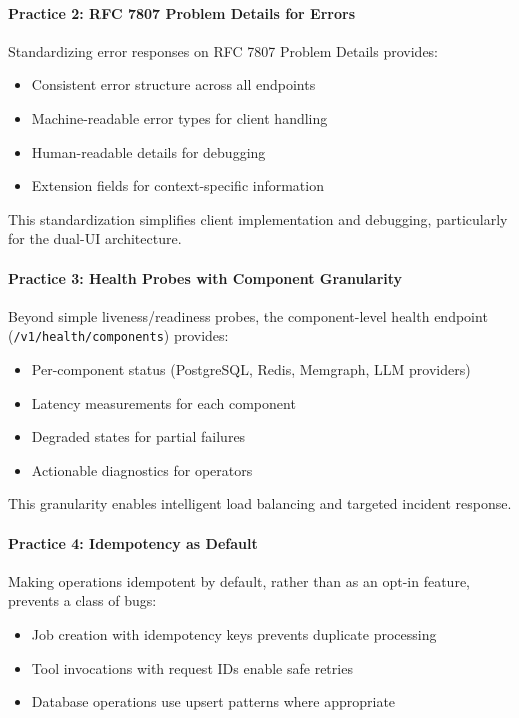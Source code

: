\paragraph{Practice 2: RFC 7807 Problem Details for Errors}

Standardizing error responses on RFC 7807 Problem Details provides:

\begin{itemize}
    \item Consistent error structure across all endpoints
    \item Machine-readable error types for client handling
    \item Human-readable details for debugging
    \item Extension fields for context-specific information
\end{itemize}

This standardization simplifies client implementation and debugging, particularly for the dual-UI architecture.

\paragraph{Practice 3: Health Probes with Component Granularity}

Beyond simple liveness/readiness probes, the component-level health endpoint (\texttt{/v1/health/components}) provides:

\begin{itemize}
    \item Per-component status (PostgreSQL, Redis, Memgraph, LLM providers)
    \item Latency measurements for each component
    \item Degraded states for partial failures
    \item Actionable diagnostics for operators
\end{itemize}

This granularity enables intelligent load balancing and targeted incident response.

\paragraph{Practice 4: Idempotency as Default}

Making operations idempotent by default, rather than as an opt-in feature, prevents a class of bugs:

\begin{itemize}
    \item Job creation with idempotency keys prevents duplicate processing
    \item Tool invocations with request IDs enable safe retries
    \item Database operations use upsert patterns where appropriate
\end{itemize}

